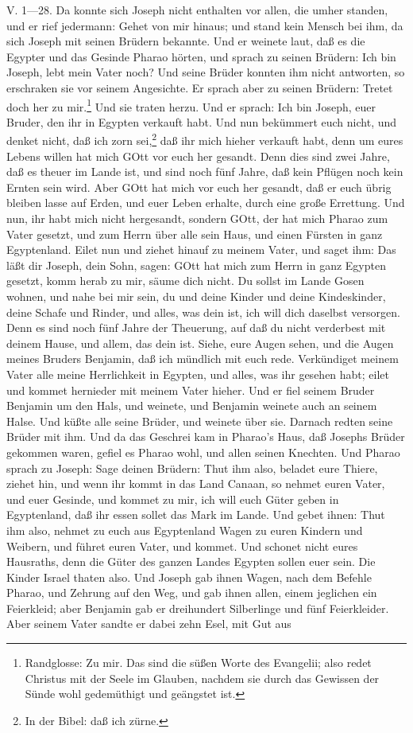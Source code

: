 \begin{schriftzitat}
V. 1—28. Da konnte sich Joseph nicht enthalten vor allen, die umher standen, und er rief jedermann: Gehet von mir hinaus; und stand kein Mensch bei ihm, da sich Joseph mit seinen Brüdern bekannte. Und er weinete laut, daß es die Egypter und das Gesinde Pharao hörten, und sprach zu seinen Brüdern: Ich bin Joseph, lebt mein Vater noch? Und seine Brüder konnten ihm nicht antworten, so erschraken sie vor seinem Angesichte. Er sprach aber zu seinen Brüdern: Tretet doch her zu mir.\footnote{Randglosse: Zu mir. Das sind die süßen Worte des Evangelii; also redet Christus mit der Seele im Glauben, nachdem sie durch das Gewissen der Sünde wohl gedemüthigt und geängstet ist.} Und sie traten herzu. Und er sprach: Ich bin Joseph, euer Bruder, den ihr in Egypten verkauft habt. Und nun bekümmert euch nicht, und denket nicht, daß ich zorn sei,\footnote{In der Bibel: daß ich zürne.} daß ihr mich hieher verkauft habt, denn um eures Lebens willen hat mich GOtt vor euch her gesandt. Denn dies sind zwei Jahre, daß es theuer im Lande ist, und sind noch fünf Jahre, daß kein Pflügen noch kein Ernten sein wird. Aber GOtt hat mich vor euch her gesandt, daß er euch übrig bleiben lasse auf Erden, und euer Leben erhalte, durch eine große Errettung. Und nun, ihr habt mich nicht hergesandt, sondern GOtt, der hat mich Pharao zum Vater gesetzt, und zum Herrn über alle sein Haus, und einen Fürsten in ganz Egyptenland. Eilet nun und ziehet hinauf zu meinem Vater, und saget ihm: Das läßt dir Joseph, dein Sohn, sagen: GOtt hat mich zum Herrn in ganz Egypten gesetzt, komm herab zu mir, säume dich nicht. Du sollst im Lande Gosen wohnen, und nahe bei mir sein, du und deine Kinder und deine Kindeskinder, deine Schafe und Rinder, und alles, was dein ist, ich will dich daselbst versorgen. Denn es sind noch fünf Jahre der Theuerung, auf daß du nicht verderbest mit deinem Hause, und allem, das dein ist. Siehe, eure Augen sehen, und die Augen meines Bruders Benjamin, daß ich mündlich mit euch rede. Verkündiget meinem Vater alle meine Herrlichkeit in Egypten, und alles, was ihr gesehen habt; eilet und kommet hernieder mit meinem Vater hieher. Und er fiel seinem Bruder Benjamin um den Hals, und weinete, und Benjamin weinete auch an seinem Halse. Und küßte alle seine Brüder, und weinete über sie. Darnach redten seine Brüder mit ihm. Und da das Geschrei kam in Pharao's Haus, daß Josephs Brüder gekommen waren, gefiel es Pharao wohl, und allen seinen Knechten. Und Pharao sprach zu Joseph: Sage deinen Brüdern: Thut ihm also, beladet eure Thiere, ziehet hin, und wenn ihr kommt in das Land Canaan, so nehmet euren Vater, und euer Gesinde, und kommet zu mir, ich will euch Güter geben in Egyptenland, daß ihr essen sollet das Mark im Lande. Und gebet ihnen: Thut ihm also, nehmet zu euch aus Egyptenland Wagen zu euren Kindern und Weibern, und führet euren Vater, und kommet. Und schonet nicht eures Hausraths, denn die Güter des ganzen Landes Egypten sollen euer sein. Die Kinder Israel thaten also. Und Joseph gab ihnen Wagen, nach dem Befehle Pharao, und Zehrung auf den Weg, und gab ihnen allen, einem jeglichen ein Feierkleid; aber Benjamin gab er dreihundert Silberlinge und fünf Feierkleider. Aber seinem Vater sandte er dabei zehn Esel, mit Gut aus 
\end{schriftzitat}
